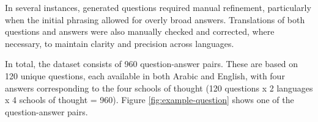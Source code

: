 \documentclass[letterpaper]{article}
\begin{document}
In several instances, generated questions required manual refinement, particularly when the initial phrasing allowed for overly broad answers. Translations of both questions and answers were also manually checked and corrected, where necessary, to maintain clarity and precision across languages.

In total, the dataset consists of 960 question-answer pairs. These are based on 120 unique questions, each available in both Arabic and English, with four answers corresponding to the four schools of thought (120 questions x 2 languages x 4 schools of thought = 960). %
Figure \ref{fig:example-question} shows one of the question-answer pairs. 

\end{document}
